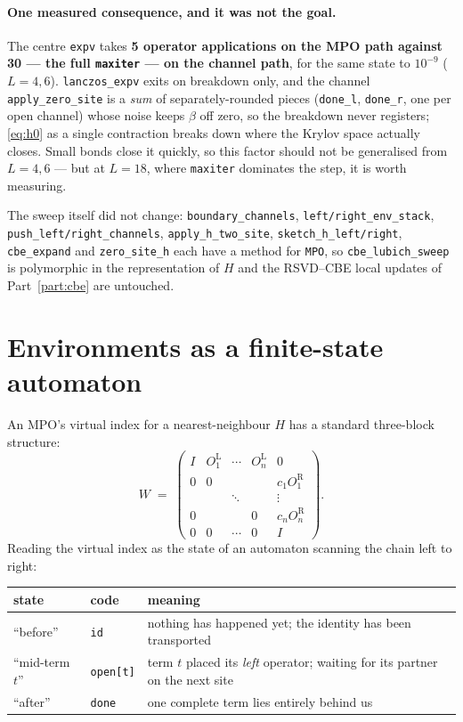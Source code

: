 \documentclass[11pt,a4paper]{article}
\newcommand{\code}[1]{\texttt{\small #1}}
\begin{document}
\paragraph{One measured consequence, and it was not the goal.} The centre \code{expv} takes
\textbf{5 operator applications on the MPO path against 30 --- the full \code{maxiter} --- on the
channel path}, for the same state to $10^{-9}$ ($L=4,6$). \code{lanczos\_expv} exits on breakdown
only, and the channel \code{apply\_zero\_site} is a \emph{sum} of separately-rounded pieces
(\code{done\_l}, \code{done\_r}, one per open channel) whose noise keeps $\beta$ off zero, so the
breakdown never registers; \eqref{eq:h0} as a single contraction breaks down where the Krylov
space actually closes. Small bonds close it quickly, so this factor should not be generalised
from $L=4,6$ --- but at $L=18$, where \code{maxiter} dominates the step, it is worth measuring.

\noindent
The sweep itself did not change: \code{boundary\_channels}, \code{left/right\_env\_stack},
\code{push\_left/right\_channels}, \code{apply\_h\_two\_site}, \code{sketch\_h\_left/right},
\code{cbe\_expand} and \code{zero\_site\_h} each have a method for \code{MPO}, so
\code{cbe\_lubich\_sweep} is polymorphic in the representation of $H$ and the RSVD--CBE local
updates of Part~\ref{part:cbe} are untouched.

\section{Environments as a finite-state automaton}

An MPO's virtual index for a nearest-neighbour $H$ has a standard three-block structure:
\[
  W \;=\;
  \begin{pmatrix}
    I & O_1^{\mathrm{L}} & \cdots & O_n^{\mathrm{L}} & 0\\
    0 & 0 & & & c_1 O_1^{\mathrm{R}}\\
      & & \ddots & & \vdots\\
    0 & & & 0 & c_n O_n^{\mathrm{R}}\\
    0 & 0 & \cdots & 0 & I
  \end{pmatrix}.
\]
Reading the virtual index as the state of an automaton scanning the chain left to right:

\begin{center}
\begin{tabular}{@{}llp{7.6cm}@{}}
\toprule
\textbf{state} & \textbf{code} & \textbf{meaning} \\
\midrule
``before'' & \code{id} & nothing has happened yet; the identity has been transported \\
``mid-term $t$'' & \code{open[t]} & term $t$ placed its \emph{left} operator; waiting for its partner on the next site \\
``after'' & \code{done} & one complete term lies entirely behind us \\
\bottomrule
\end{tabular}
\end{center}
\end{document}
